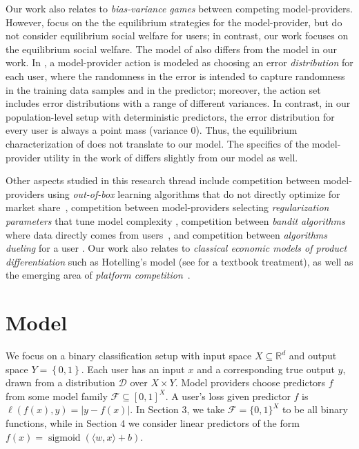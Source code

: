 \documentclass[letterpaper,11pt]{article}
\theoremstyle{plain}
\DeclareMathOperator*{\sigmoid}{sigmoid}
\begin{document}
Our work also relates to \textit{bias-variance games} \citep{FGHJN19} between competing model-providers. However, \citet{FGHJN19} focus on the the equilibrium strategies for the model-provider, but do not consider equilibrium social welfare for users; in contrast, our work focuses on the equilibrium social welfare. The model of \citet{FGHJN19} also differs from the model in our work. In \citet{FGHJN19}, a model-provider action is modeled as choosing an error \textit{distribution} for each user, where the randomness in the error is intended to capture randomness in the training data samples and in the predictor; moreover, the action set includes error distributions with a range of different variances. In contrast, in our population-level setup with deterministic predictors, the error distribution for every user is always a point mass (variance 0). Thus, the equilibrium characterization of \citet{FGHJN19} does not translate to our model. The specifics of the model-provider utility in the work of \citet{FGHJN19} differs slightly from our model as well. 

Other aspects studied in this research thread include competition between model-providers using \textit{out-of-box} learning algorithms that do not directly optimize for market share~\citep{GZKZ21, KGZ22, DCRMF22}, competition between model-providers selecting \textit{regularization parameters} that tune model complexity \citep{IK22}, competition between \textit{bandit algorithms} where data directly comes from users~\citep{AMSW20, JJH22}, and competition between \textit{algorithms dueling} for a user \citep{IKLMPT11}. Our work also relates to \textit{classical economic models of product differentiation} such as Hotelling's model \citep{H29, DGT79} (see \citet{ProductDifferentiation} for a textbook treatment), as well as the emerging area of \textit{platform competition}~\citep[see, e.g.,][]{J21, C21}. 



\section{Model}\label{sec:model}

We focus on a binary classification setup with input space $X\subseteq \mathbb{R}^d$ and output space $Y = \left\{0,1\right\}$. Each user has an input $x$ and a corresponding true output $y$, drawn from a distribution $\mathcal{D}$ over $X \times Y$. Model providers choose predictors $f$ from some model family $\mathcal{F} \subseteq [0,1]^X$. A user's loss given predictor $f$ is $\ell(f(x), y) = |y - f(x)|$. In Section 3, we take $\mathcal{F} = \{0,1\}^X$ to be all binary functions, while in Section 4 we consider linear predictors of the form $f(x) = \sigmoid(\langle w, x \rangle + b)$. 
\end{document}
